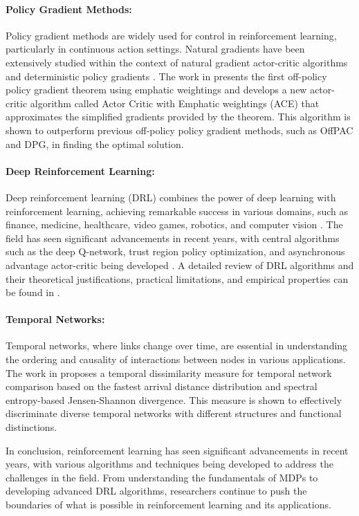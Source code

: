 \paragraph{Policy Gradient Methods:}
Policy gradient methods are widely used for control in reinforcement learning, particularly in continuous action settings. Natural gradients have been extensively studied within the context of natural gradient actor-critic algorithms and deterministic policy gradients \cite{2209.01820}. The work in \cite{1811.09013} presents the first off-policy policy gradient theorem using emphatic weightings and develops a new actor-critic algorithm called Actor Critic with Emphatic weightings (ACE) that approximates the simplified gradients provided by the theorem. This algorithm is shown to outperform previous off-policy policy gradient methods, such as OffPAC and DPG, in finding the optimal solution.

\paragraph{Deep Reinforcement Learning:}
Deep reinforcement learning (DRL) combines the power of deep learning with reinforcement learning, achieving remarkable success in various domains, such as finance, medicine, healthcare, video games, robotics, and computer vision \cite{2108.11510}. The field has seen significant advancements in recent years, with central algorithms such as the deep Q-network, trust region policy optimization, and asynchronous advantage actor-critic being developed \cite{1708.05866}. A detailed review of DRL algorithms and their theoretical justifications, practical limitations, and empirical properties can be found in \cite{1906.10025}.

\paragraph{Temporal Networks:}
Temporal networks, where links change over time, are essential in understanding the ordering and causality of interactions between nodes in various applications. The work in \cite{2111.01334} proposes a temporal dissimilarity measure for temporal network comparison based on the fastest arrival distance distribution and spectral entropy-based Jensen-Shannon divergence. This measure is shown to effectively discriminate diverse temporal networks with different structures and functional distinctions.

In conclusion, reinforcement learning has seen significant advancements in recent years, with various algorithms and techniques being developed to address the challenges in the field. From understanding the fundamentals of MDPs to developing advanced DRL algorithms, researchers continue to push the boundaries of what is possible in reinforcement learning and its applications.